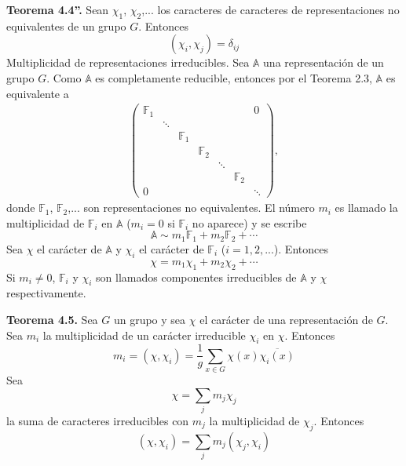 \documentclass[12pt]{book}
\theoremstyle{definition}
\newcounter{in}
\begin{document}
\textbf{Teorema 4.4''. } Sean $\chi_{1}$, $\chi_{2}$,... los
caracteres de caracteres de representaciones no equivalentes de un
grupo $G$. Entonces
\begin{equation*}
(\chi_{i},\chi_{j})=\delta_{ij}
\end{equation*} 
Multiplicidad de representaciones irreducibles. Sea $\mathbb{A}$ una
representación de un grupo $G$. Como $\mathbb{A}$ es completamente
reducible, entonces por el Teorema 2.3, $\mathbb{A}$ es equivalente a
\begin{equation*}
\begin{aligned}
\begin{pmatrix}
\mathbb{F}_{1} & & & & & & 0\\ 
 & \ddots & & & & & \\
 & & \mathbb{F}_{1} & & & & \\
 & & & \mathbb{F}_{2} & & & \\
 & & & & \ddots & & \\
 & & & & & \mathbb{F}_{2} & \\
0 & & & & & & \ddots
\end{pmatrix},
\end{aligned}
\end{equation*}
donde $\mathbb{F}_{1}$, $\mathbb{F}_{2}$,... son representaciones no
equivalentes. El número $m_{i}$ es llamado la multiplicidad de
$\mathbb{F}_{i}$ en $\mathbb{A}$ ($m_{i}=0$ si $\mathbb{F}_{i}$ no
aparece) y se escribe
\begin{equation*}
\mathbb{A} \sim m_{1} \mathbb{F}_{1}+m_{2} \mathbb{F}_{2}+ \cdots
\end{equation*}
Sea $\chi$ el carácter de $\mathbb{A}$ y $\chi_{i}$ el carácter de $\mathbb{F}_{i}$ ($i = 1, 2, ...$). Entonces
\begin{equation*}
\chi =m_{1} \chi_{1}+ m_{2} \chi_{2}+ \cdots
\end{equation*}
Si $m_{i} \neq 0$, $\mathbb{F}_{i}$ y $\chi_{i}$ son llamados
componentes irreducibles de $\mathbb{A}$ y $\chi$ respectivamente.

\textbf{Teorema 4.5. } Sea $G$ un grupo y sea $\chi$ el carácter de una
representación de $G$. Sea $m_{i}$ la multiplicidad de un carácter
irreducible $\chi_{i}$ en $\chi$. Entonces
\begin{equation*}
m_{i} = (\chi,\chi_{i}) = \frac{1}{g} \sum_{x \in G} \chi(x) \overline{\chi_{i}(x)}
\end{equation*}
Sea $$\chi=\sum_{j} m_{j} \chi_{j}$$ la suma de caracteres
irreducibles con $m_{j}$ la multiplicidad de $\chi_{j}$. Entonces
\begin{equation*}
(\chi,\chi_{i}) = \sum_{j} m_{j} (\chi_{j},\chi_{i})
\end{equation*}
\end{document}
